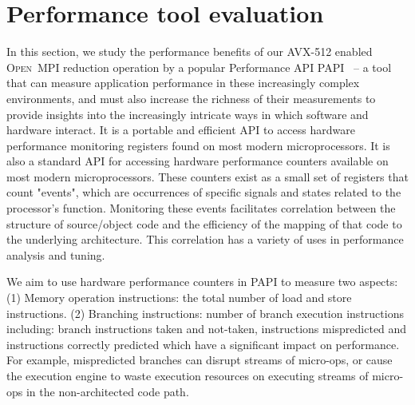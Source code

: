 \documentclass[sigconf,review]{acmart}
\newcommand{\ompi}[0]{\textsc{Open~MPI}\xspace}
\begin{document}
\section{Performance tool evaluation}\label{sec:perf}
In this section, we study the performance benefits of our AVX-512 enabled \ompi reduction
operation by a popular Performance API PAPI~\cite{papi} -- a tool that can measure
application performance in these increasingly complex environments, and must also
increase the richness of their measurements to provide insights into the
increasingly intricate ways in which software and hardware interact.
It is a portable and efficient API to access hardware performance
monitoring registers found on most modern microprocessors.
It is also a standard API for accessing hardware
performance counters available on most modern microprocessors. These counters exist
as a small set of registers that count "events", which are occurrences of specific signals
and states related to the processor's function. Monitoring these events facilitates
correlation between the structure of source/object code and the efficiency of the mapping
of that code to the underlying architecture. This correlation has a variety of uses in
performance analysis and tuning.


We aim to use hardware performance counters in PAPI to measure two aspects:
(1) Memory operation instructions: the total number of load and store instructions.
(2) Branching instructions: number of branch execution instructions including: branch instructions taken and not-taken,
instructions mispredicted and instructions correctly predicted which have a significant impact on performance.
For example, mispredicted branches can disrupt streams of micro-ops, or cause
the execution engine to waste execution resources on executing
streams of micro-ops in the non-architected code path.
\end{document}
